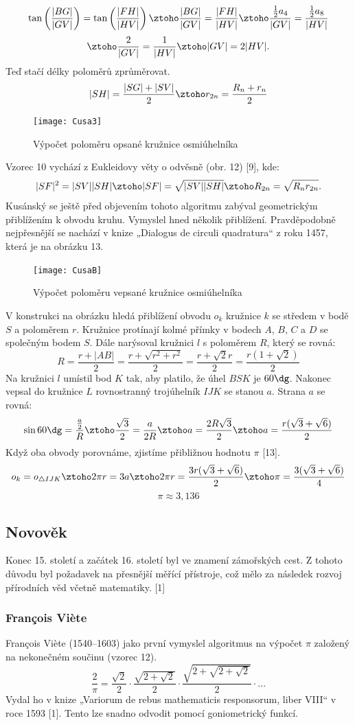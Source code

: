 \documentclass[rocnikovka]{gzwroc} %
\begin{document}
$$
\tan\left(\frac{|BG|}{|GV|}\right)=\tan\left(\frac{|FH|}{|HV|}\right) \ztoho \frac{|BG|}{|GV|}=\frac{|FH|}{|HV|} \ztoho \frac{\frac{1}{2}a_4}{|GV|}=\frac{\frac{1}{2}a_8}{|HV|}
$$
$$
\ztoho \frac{2}{|GV|}=\frac{1}{|HV|} \ztoho |GV|=2|HV|.
$$
Teď stačí délky poloměrů zprůměrovat.
$$
|SH|=\frac{|SG|+|SV|}{2} \ztoho r_{2n}=\frac{R_n+r_n}{2}
$$
\begin{figure}[!ht]
\texttt{[image: Cusa3]}
\caption{Výpočet poloměru opsané kružnice osmiúhelníka}
\label{fig:kruh}
\end{figure}
Vzorec 10 vychází z Eukleidovy věty o odvěsně (obr. 12) [9], kde:
$$
|SF|^2=|SV||SH| \ztoho |SF|=\sqrt{|SV||SH|} \ztoho R_{2n}=\sqrt{R_nr_{2n}}.
$$
Kusánský se ještě před objevením tohoto algoritmu zabýval geometrickým  přiblížením k obvodu kruhu. Vymyslel hned několik přiblížení. Pravděpodobně nejpřesnější se nachází v knize „Dialogus de circuli quadratura“ z roku 1457, která je na obrázku 13.
\begin{figure}[!ht]
\texttt{[image: CusaB]}
\caption{Výpočet poloměru vepsané kružnice osmiúhelníka}
\label{fig:kruh}
\end{figure}
V konstrukci na obrázku hledá přiblížení obvodu $o_k$ kružnice $k$ se středem v bodě $S$ a poloměrem $r$. Kružnice protínají kolmé přímky v bodech $A$, $B$, $C$ a $D$ se společným bodem $S$. Dále narýsoval kružnici $l$ s poloměrem $R$, který se rovná:
$$
R=\frac{r+|AB|}{2}=\frac{r+\sqrt{r^2+r^2}}{2}=\frac{r+\sqrt{2}r}{2}=\frac{r(1+\sqrt{2})}{2}
$$
Na kružnici $l$ umístil bod $K$ tak, aby platilo, že úhel $BSK$ je $60\dg$. Nakonec vepsal do kružnice $L$ rovnostranný trojúhelník $IJK$ se stanou $a$. Strana $a$ se rovná:
$$
\sin 60\dg =\frac{\frac{a}{2}}{R} \ztoho \frac{\sqrt{3}}{2}= \frac{a}{2R} \ztoho a= \frac{2R\sqrt{3}}{2} \ztoho a= \frac{r(\sqrt{3}+\sqrt{6})}{2}
$$
Když oba obvody porovnáme, zjistíme přibližnou hodnotu $\pi$ [13].
$$
o_k=o_{\triangle IJK} \ztoho 2\pi r=3a \ztoho 2\pi r= \frac{3r(\sqrt{3}+\sqrt{6})}{2} \ztoho \pi= \frac{3(\sqrt{3}+\sqrt{6})}{4}
$$
$$
\pi \approx 3,136
$$
\subsection{Novověk}
Konec 15. století a začátek 16. století byl ve znamení zámořských cest. Z tohoto důvodu byl požadavek na přesnější měřící přístroje, což mělo za následek rozvoj přírodních věd včetně matematiky. [1]
\subsubsection{François Viète}
François Viète (1540–1603) jako první vymyslel algoritmus na výpočet $\pi$ založený na nekonečném součinu (vzorec 12).
\begin{equation}
\frac{2}{\pi}=\frac{\sqrt{2}}{2}\cdot\frac{\sqrt{2+\sqrt{2}}}{2}\cdot\frac{\sqrt{2+\sqrt{2+\sqrt{2}}}}{2}\cdot ...
\end{equation}
Vydal ho v knize „Variorum de rebus mathematicis responsorum, liber VIII“ v roce 1593 [1]. Tento lze snadno odvodit pomocí goniometrický funkcí.
\end{document}
